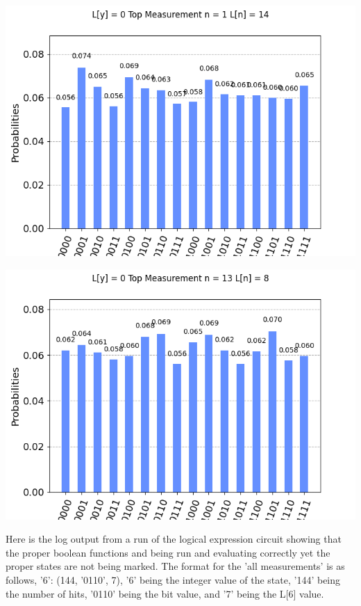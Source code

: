 \documentclass[11pt]{article}
\begin{document}
\begin{center}
\includegraphics[width=\textwidth]{custom_3.png}

\includegraphics[width=\textwidth]{custom_4.png}
\end{center}

\newpage
Here is the log output from a run of the logical expression circuit showing that the proper boolean functions and being run and evaluating correctly yet the proper states are not being marked. The format for the 'all measurements' is as follows, '6': (144, '0110', 7), '6' being the integer value of the state, '144' being the number of hits, '0110' being the bit value, and '7' being the L[6] value.
\end{document}
